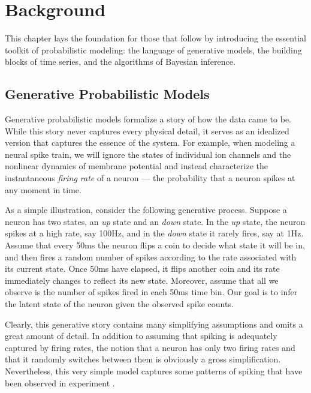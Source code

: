 
\chapter{Background}
This chapter lays the foundation for those that follow by introducing 
the essential toolkit of probabilistic modeling: the language of 
generative models, the building blocks of time series, and the algorithms
of Bayesian inference. 


\section{Generative Probabilistic Models}
Generative probabilistic models formalize a story of how the data came to be. 
While this story never captures every physical detail, it serves as an 
idealized version that captures the essence of the system. For example, when
modeling a neural spike train, we will ignore the states of individual ion 
channels and the nonlinear dynamics of membrane potential and instead 
characterize the instantaneous \emph{firing rate} of a neuron --- the 
probability that a neuron spikes at any moment in time. 

As a simple illustration, consider the following generative
process. Suppose a neuron has two states, an \emph{up} state and an
\emph{down} state. In the \emph{up} state, the neuron spikes at a high
rate, say 100Hz, and in the \emph{down} state it rarely fires, say at 1Hz.
Assume that every 50ms the neuron flips a coin to decide what state it
will be in, and then fires a random number of spikes according to the
rate associated with its current state. Once 50ms have elapsed, it
flips another coin and its rate immediately changes to reflect its new
state. Moreover, assume that all we observe is the number of spikes
fired in each 50ms time bin.  Our goal is to infer the latent state of
the neuron given the observed spike counts.

Clearly, this generative story contains many simplifying assumptions
and omits a great amount of detail. In addition to assuming that
spiking is adequately captured by firing rates, the notion that a
neuron has only two firing rates and that it randomly switches between
them is obviously a gross simplification. Nevertheless, this very
simple model captures some patterns of spiking that have been observed
in experiment \cite{cowan1994spontaneous, shu2003turning}. 

